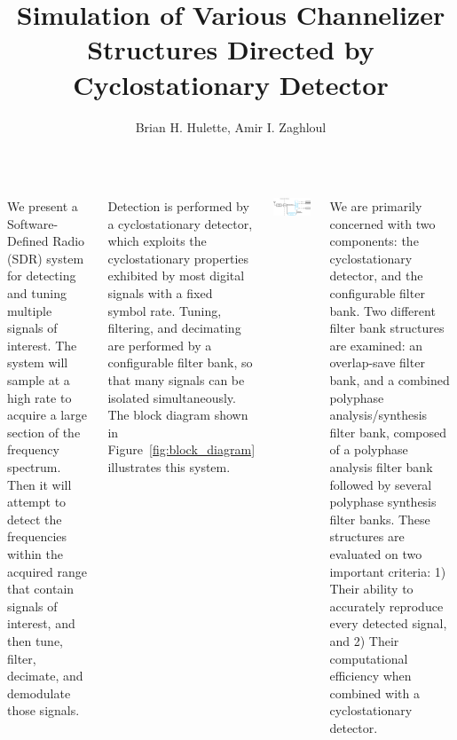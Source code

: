 \documentclass[24pt, a0papper, portrait]{tikzposter}
\title{Simulation of Various Channelizer Structures 
       Directed by Cyclostationary Detector}
\author{Brian H. Hulette, Amir I. Zaghloul}
\institute{Virginia Tech Dept. of Electrical Engineering}
\begin{document}
 
\maketitle

\begin{columns}
{
We present a Software-Defined Radio (SDR) system for detecting and tuning 
multiple signals of interest. The system will sample
at a high rate to acquire a large section of the frequency spectrum. Then it will attempt to
detect the frequencies within the acquired range that contain signals of
interest, and then tune, filter, decimate, and demodulate those signals. 

Detection is performed by a cyclostationary detector, which
exploits the cyclostationary properties exhibited by most digital signals with
a fixed symbol rate.  Tuning, filtering, and decimating are performed by
a configurable filter bank, so that many signals can be isolated
simultaneously.  The block diagram shown in Figure~\ref{fig:block_diagram} 
illustrates this system.

        \begin{tikzfigure}
            \includegraphics[width=\linewidth]{block_diagram}
            \label{fig:block_diagram}
        \end{tikzfigure}

We are primarily concerned with two components: the cyclostationary detector,
and the configurable filter bank.  Two different filter bank structures are
examined: an overlap-save filter bank, and a combined polyphase
analysis/synthesis filter bank, composed of a polyphase analysis filter bank
followed by several polyphase synthesis filter banks.  These structures are
evaluated on two important criteria:
1) Their ability to accurately reproduce every detected signal, and 2) Their
   computational efficiency when combined with a cyclostationary detector.

}
\end{columns}
\end{document}
